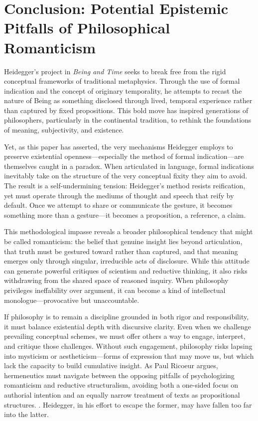 \documentclass{article}
\begin{document}
\section*{Conclusion: Potential Epistemic Pitfalls of Philosophical Romanticism}

Heidegger’s project in \textit{Being and Time} seeks to break free from the rigid conceptual frameworks of traditional metaphysics. Through the use of formal indication and the concept of originary temporality, he attempts to recast the nature of Being as something disclosed through lived, temporal experience rather than captured by fixed propositions. This bold move has inspired generations of philosophers, particularly in the continental tradition, to rethink the foundations of meaning, subjectivity, and existence.

Yet, as this paper has asserted, the very mechanisms Heidegger employs to preserve existential openness—especially the method of formal indication—are themselves caught in a paradox. When articulated in language, formal indications inevitably take on the structure of the very conceptual fixity they aim to avoid. The result is a self-undermining tension: Heidegger’s method resists reification, yet must operate through the mediums of thought and speech that reify by default. Once we attempt to share or communicate the gesture, it becomes something more than a gesture—it becomes a proposition, a reference, a claim.

This methodological impasse reveals a broader philosophical tendency that might be called romanticism: the belief that genuine insight lies beyond articulation, that truth must be gestured toward rather than captured, and that meaning emerges only through singular, irreducible acts of disclosure. While this attitude can generate powerful critiques of scientism and reductive thinking, it also risks withdrawing from the shared space of reasoned inquiry. When philosophy privileges ineffability over argument, it can become a kind of intellectual monologue—provocative but unaccountable.

If philosophy is to remain a discipline grounded in both rigor and responsibility, it must balance existential depth with discursive clarity. Even when we challenge prevailing conceptual schemes, we must offer others a way to engage, interpret, and critique those challenges. Without such engagement, philosophy risks lapsing into mysticism or aestheticism—forms of expression that may move us, but which lack the capacity to build cumulative insight. As Paul Ricoeur argues, hermeneutics must navigate between the opposing pitfalls of psychologizing romanticism and reductive structuralism, avoiding both a one-sided focus on authorial intention and an equally narrow treatment of texts as propositional structures. \parencite[pp.~22-23]{ricoeur1976}. Heidegger, in his effort to escape the former, may have fallen too far into the latter.
\end{document}
